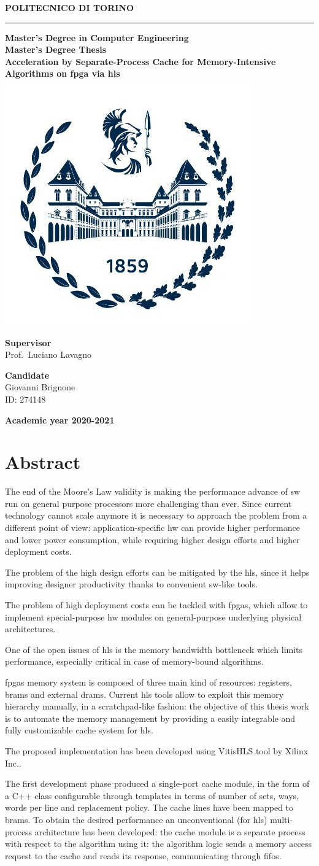 \documentclass[11pt,a4paper,oneside]{memoir}
\renewcommand*{\maketitle}%
{
	\newgeometry{left=2cm,right=2cm,top=3cm,bottom=3.5cm}

	\begin{center}
		\begingroup
		{\Huge\textbf{POLITECNICO DI TORINO}}\\[\baselineskip]
		\rule{\textwidth}{2pt}\par
		\vspace*{1em}
		{\LARGE\textbf{Master's Degree in Computer Engineering}}\\[\baselineskip]
		\vspace*{1em}
		{\Large\textbf{Master's Degree Thesis}}\\
		\vspace*{2cm}
		{\huge\textbf{Acceleration by Separate-Process Cache for
		Memory-Intensive Algorithms on \acs{fpga} via \acl{hls}}}\\
		\vspace*{1cm}
		\includegraphics[width=.3\textwidth]{figures/polito-logo}
	\end{center}
	\vfill
	\begin{minipage}{0.4\textwidth}
		\begin{flushleft}
			{\Large
				\textbf{Supervisor}\\
				Prof.\ Luciano Lavagno
			}
		\end{flushleft}
	\end{minipage}
	\begin{minipage}{0.4\textwidth}
		\begin{flushright} 
			{\Large
				\textbf{Candidate}\\
				Giovanni Brignone\\
				ID: 274148
			}
		\end{flushright}
	\end{minipage}  
	\vspace*{2cm}
	\begin{center}
		{\Large\textbf{Academic year 2020-2021}}
	\end{center}
	\endgroup

	\restoregeometry 
}
\begin{document}
\pagestyle{empty}
\maketitle

\clearpage
\pagestyle{plain}

\frontmatter
\chapter*{Abstract}
The end of the Moore's Law validity is making the performance advance of
\acl{sw} run on general purpose processors more challenging than ever.
Since current technology cannot scale anymore it is necessary to approach the
problem from a different point of view: application-specific \acl{hw} can
provide higher performance and lower power consumption, while requiring higher
design efforts and higher deployment costs.

The problem of the high design efforts can be mitigated by the \acf{hls}, since
it helps improving designer productivity thanks to convenient \acl{sw}-like
tools.

The problem of high deployment costs can be tackled with \acp{fpga}, which allow
to implement special-purpose \acl{hw} modules on general-purpose underlying
physical architectures.

\bigskip
One of the open issues of \ac{hls} is the memory bandwidth bottleneck which
limits performance, especially critical in case of memory-bound algorithms.

\acp{fpga} memory system is composed of three main kind of resources: registers,
\acp{bram} and external \acp{dram}.
Current \ac{hls} tools allow to exploit this memory hierarchy manually, in a
scratchpad-like fashion: the objective of this thesis work is to automate the
memory management by providing a easily integrable and fully customizable cache
system for \ac{hls}.

\bigskip
The proposed implementation has been developed using Vitis\texttrademark HLS
tool by Xilinx Inc..

The first development phase produced a single-port cache module, in the form of
a C++ class configurable through templates in terms of number of sets, ways,
words per line and replacement policy.
The cache lines have been mapped to \acp{bram}.
To obtain the desired performance an unconventional (for \ac{hls}) multi-process
architecture has been developed: the cache module is a separate process with
respect to the algorithm using it: the algorithm logic sends a memory access
request to the cache and reads its response, communicating through \acsp{fifo}.
\end{document}

